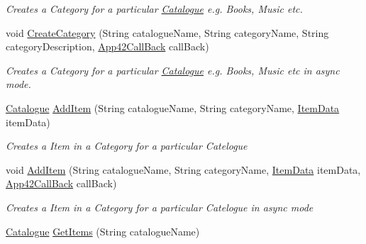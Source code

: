 \begin{DoxyCompactItemize}
\begin{DoxyCompactList}\small\item\em Creates a Category for a particular \hyperlink{classcom_1_1shephertz_1_1app42_1_1paas_1_1sdk_1_1csharp_1_1shopping_1_1_catalogue}{Catalogue} e.\+g. Books, Music etc. \end{DoxyCompactList}\item 
void \hyperlink{classcom_1_1shephertz_1_1app42_1_1paas_1_1sdk_1_1csharp_1_1shopping_1_1_catalogue_service_ab69b0c122fa1af0afb1eac397a176683}{Create\+Category} (String catalogue\+Name, String category\+Name, String category\+Description, \hyperlink{interfacecom_1_1shephertz_1_1app42_1_1paas_1_1sdk_1_1csharp_1_1_app42_call_back}{App42\+Call\+Back} call\+Back)
\begin{DoxyCompactList}\small\item\em Creates a Category for a particular \hyperlink{classcom_1_1shephertz_1_1app42_1_1paas_1_1sdk_1_1csharp_1_1shopping_1_1_catalogue}{Catalogue} e.\+g. Books, Music etc in async mode. \end{DoxyCompactList}\item 
\hyperlink{classcom_1_1shephertz_1_1app42_1_1paas_1_1sdk_1_1csharp_1_1shopping_1_1_catalogue}{Catalogue} \hyperlink{classcom_1_1shephertz_1_1app42_1_1paas_1_1sdk_1_1csharp_1_1shopping_1_1_catalogue_service_ae1b91031af6447c5c6b50e1d67fd138c}{Add\+Item} (String catalogue\+Name, String category\+Name, \hyperlink{classcom_1_1shephertz_1_1app42_1_1paas_1_1sdk_1_1csharp_1_1shopping_1_1_item_data}{Item\+Data} item\+Data)
\begin{DoxyCompactList}\small\item\em Creates a Item in a Category for a particular Catelogue \end{DoxyCompactList}\item 
void \hyperlink{classcom_1_1shephertz_1_1app42_1_1paas_1_1sdk_1_1csharp_1_1shopping_1_1_catalogue_service_aee2ae0f0635928892b960d8ed42a6b2e}{Add\+Item} (String catalogue\+Name, String category\+Name, \hyperlink{classcom_1_1shephertz_1_1app42_1_1paas_1_1sdk_1_1csharp_1_1shopping_1_1_item_data}{Item\+Data} item\+Data, \hyperlink{interfacecom_1_1shephertz_1_1app42_1_1paas_1_1sdk_1_1csharp_1_1_app42_call_back}{App42\+Call\+Back} call\+Back)
\begin{DoxyCompactList}\small\item\em Creates a Item in a Category for a particular Catelogue in async mode \end{DoxyCompactList}\item 
\hyperlink{classcom_1_1shephertz_1_1app42_1_1paas_1_1sdk_1_1csharp_1_1shopping_1_1_catalogue}{Catalogue} \hyperlink{classcom_1_1shephertz_1_1app42_1_1paas_1_1sdk_1_1csharp_1_1shopping_1_1_catalogue_service_a94e2e69d6e8e98e2e72b21b21b11bbbe}{Get\+Items} (String catalogue\+Name)

\end{DoxyCompactItemize}

